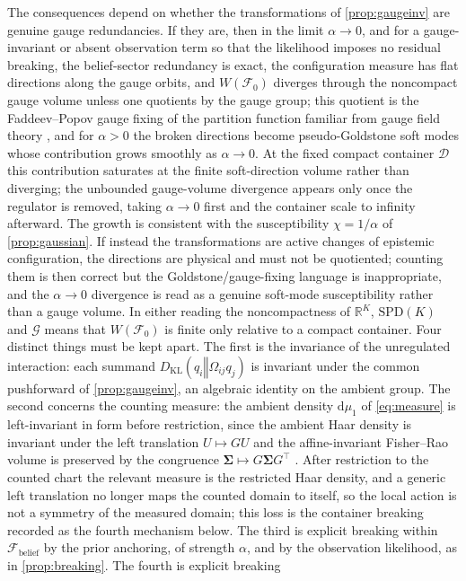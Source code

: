 \documentclass[11pt]{article}
\theoremstyle{plain}
\theoremstyle{definition}
\newcommand{\KL}[2]{D_{\mathrm{KL}}\mathopen{}\left(#1 \mathbin{\Vert} #2\right)\mathclose{}}
\newcommand{\R}{\mathbb{R}}
\newcommand{\SPD}{\mathrm{SPD}}
\newcommand{\dd}{\mathrm{d}}
\newcommand{\bSigma}{\boldsymbol{\Sigma}}
\newcommand{\Fcal}{\mathcal{F}}
\newcommand{\Dcal}{\mathcal{D}}
\newcommand{\Gcal}{\mathcal{G}}
\newcommand{\Wmeta}{W}
\newcommand{\Omegaij}{\Omega_{ij}}
\begin{document}
The consequences depend on whether the transformations of \cref{prop:gaugeinv} are
genuine gauge redundancies. If they are, then in the limit $\alpha\to0$, and for a gauge-invariant or absent observation
term so that the likelihood imposes no residual breaking, the belief-sector redundancy is
exact, the configuration measure has flat directions along the gauge orbits, and
$\Wmeta(\Fcal_0)$ diverges through the noncompact gauge volume unless one quotients by the
gauge group; this quotient is the Faddeev--Popov gauge
fixing of the partition function familiar from gauge field theory
\citep{faddeev1967feynman}, and for $\alpha>0$ the broken directions become
pseudo-Goldstone soft modes whose contribution grows smoothly as $\alpha\to0$. At the fixed compact
container $\Dcal$ this contribution saturates at the finite soft-direction volume rather than diverging;
the unbounded gauge-volume divergence appears only once the regulator is removed, taking $\alpha\to0$ first
and the container scale to infinity afterward. The growth is consistent with the susceptibility
$\chi=1/\alpha$ of \cref{prop:gaussian}. If instead
the transformations are active changes of epistemic configuration, the directions are
physical and must not be quotiented; counting them is then correct but the
Goldstone/gauge-fixing language is inappropriate, and the $\alpha\to0$ divergence is
read as a genuine soft-mode susceptibility rather than a gauge volume. In either reading
the noncompactness of $\R^{K}$, $\SPD(K)$ and $\Gcal$ means that $\Wmeta(\Fcal_0)$ is
finite only relative to a compact container. Four distinct things must be kept apart. The
first is the invariance of the unregulated interaction: each summand $\KL{q_i}{\Omegaij q_j}$
is invariant under the common pushforward of \cref{prop:gaugeinv}, an algebraic identity on the
ambient group. The second concerns the counting measure: the ambient density $\dd\mu_1$
of \cref{eq:measure} is left-invariant in form before restriction, since the ambient Haar density is
invariant under the left translation $U\mapsto G U$ and the affine-invariant Fisher--Rao volume is
preserved by the congruence $\bSigma\mapsto G\bSigma G^{\top}$ \citep{pennec2006riemannian}. After
restriction to the counted chart the relevant measure is the restricted Haar density, and a generic
left translation no longer maps the counted domain to itself, so the local action is not a symmetry of
the measured domain; this loss is the container breaking recorded as the fourth mechanism below.
The third is explicit breaking within $\Fcal_{\mathrm{belief}}$ by the prior anchoring, of strength $\alpha$, and by the observation likelihood, as in \cref{prop:breaking}. The fourth is explicit breaking
\end{document}
